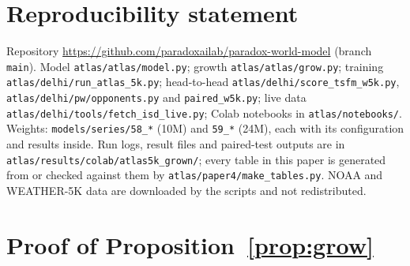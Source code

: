 \documentclass{article}
\begin{document}
\section*{Reproducibility statement}
Repository \url{https://github.com/paradoxailab/paradox-world-model} (branch \texttt{main}). Model
\texttt{atlas/atlas/model.py}; growth \texttt{atlas/atlas/grow.py}; training \texttt{atlas/delhi/run\_atlas\_5k.py};
head-to-head \texttt{atlas/delhi/score\_tsfm\_w5k.py}, \texttt{atlas/delhi/pw/opponents.py} and
\texttt{paired\_w5k.py}; live data \texttt{atlas/delhi/tools/fetch\_isd\_live.py}; Colab notebooks in
\texttt{atlas/notebooks/}. Weights: \texttt{models/series/58\_*} (10M) and \texttt{59\_*} (24M), each with its
configuration and results inside. Run logs, result files and paired-test outputs are in
\texttt{atlas/results/colab/atlas5k\_grown/}; every table in this paper is generated from or checked against them by
\texttt{atlas/paper4/make\_tables.py}. NOAA and WEATHER-5K data are downloaded by the scripts and not redistributed.




\newpage
\appendix
\raggedbottom

\section{Proof of Proposition~\ref{prop:grow}}
\label{app:proofs}
\end{document}
